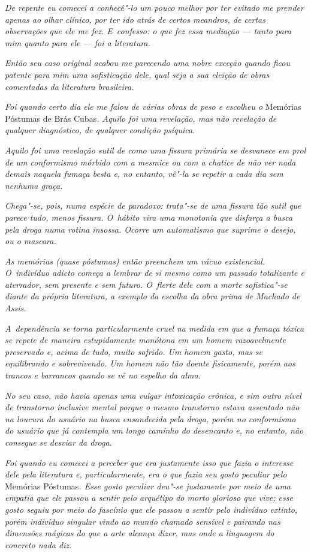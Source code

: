 \emph{De repente eu comecei a conhecê"-lo um pouco melhor por ter evitado
me prender apenas ao olhar clínico, por ter ido atrás de certos
meandros, de certas observações que ele me fez. E~confesso: o que fez
essa mediação --- tanto para mim quanto para ele --- foi a literatura.}~

\emph{Então seu caso original acabou me parecendo uma nobre exceção
quando ficou patente para mim uma sofisticação dele, qual seja a sua
eleição de obras comentadas da literatura brasileira.}~

\emph{Foi quando certo dia ele me falou de várias obras de peso e
escolheu o} Memórias Póstumas de Brás Cubas\emph{. Aquilo foi uma revelação,
mas não revelação de qualquer diagnóstico, de qualquer condição
psíquica.}~

\emph{Aquilo foi uma revelação sutil de como uma fissura primária se
desvanece em prol de um conformismo mórbido com a mesmice ou com a
chatice de não ver nada demais naquela fumaça besta e, no entanto, vê"-la
se repetir a cada dia sem nenhuma graça.}~

\emph{Chega"-se, pois, numa espécie de paradoxo: trata"-se de uma fissura
tão sutil que parece tudo, menos fissura. O~hábito vira uma monotonia que
disfarça a busca pela droga numa rotina insossa. Ocorre um automatismo
que suprime o desejo, ou o mascara.}~

\emph{As memórias (quase póstumas) então preenchem um vácuo existencial.
O~indivíduo adicto começa a lembrar de si mesmo como um passado
totalizante e aterrador, sem presente e sem futuro. O~flerte dele com a
morte sofistica"-se diante da própria literatura, a exemplo da escolha da
obra prima de Machado de Assis.}~

\emph{A~dependência se torna particularmente cruel na medida em que a
fumaça tóxica se repete de maneira estupidamente monótona em um homem
razoavelmente preservado e, acima de tudo, muito sofrido. Um homem
gasto, mas se equilibrando e sobrevivendo. Um homem não tão doente
fisicamente, porém aos trancos e barrancos quando se vê no espelho da
alma.}~

\emph{No seu caso, não havia apenas uma vulgar intoxicação crônica, e
sim outro nível de transtorno inclusive mental porque o mesmo transtorno
estava assentado não na loucura do usuário na busca ensandecida pela
droga, porém no conformismo do usuário que já contempla um longo caminho
do desencanto e, no entanto, não consegue se desviar da droga.}~

\emph{Foi quando eu comecei a perceber que era justamente isso que fazia
o interesse dele pela literatura e, particularmente, era o que fazia seu
gosto peculiar pelo} Memórias Póstumas\emph{. Esse gosto peculiar deu"-se
justamente por meio de uma empatia que ele passou a sentir pelo
arquétipo do morto glorioso que vive; esse gosto seguiu por meio do
fascínio que ele passou a sentir pelo indivíduo extinto, porém indivíduo
singular vindo ao mundo chamado sensível e pairando nas dimensões
mágicas do que a arte alcança dizer, mas onde a linguagem do concreto
nada diz.}~

